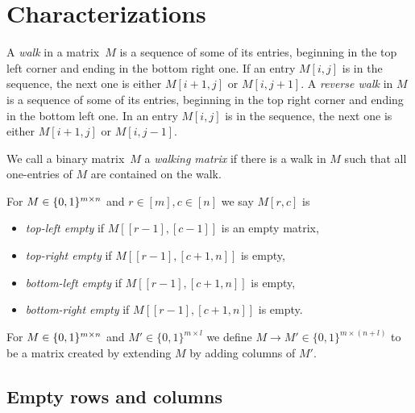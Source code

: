 \newsavebox{\smlmat}
\savebox{\smlmat}{$\smm{\bullet&\bullet\\\bullet& }$}
\newsavebox{\smlmatb}
\savebox{\smlmatb}{$\smm{\bullet&\bullet\\\bullet&\bullet}$}
\newsavebox{\smlmatc}
\savebox{\smlmatc}{$\smm{\bullet&\bullet&\bullet\\ &\bullet& }$}

\chapter{Characterizations}

\begin{defn}
A \emph{walk} in a matrix~$M$ is a sequence of some of its entries, beginning in the top left corner and ending in the bottom right one. If an entry $M[i,j]$ is in the sequence, the next one is either $M[i+1,j]$ or $M[i,j+1]$. A \emph{reverse walk} in $M$ is a sequence of some of its entries, beginning in the top right corner and ending in the bottom left one. In an entry $M[i,j]$ is in the sequence, the next one is either $M[i+1,j]$ or $M[i,j-1]$.
\end{defn}

\begin{defn}
We call a binary matrix~$M$ a \emph{walking matrix} if there is a walk in $M$ such that all one-entries of $M$ are contained on the walk.
\end{defn}

\begin{defn}
For $M\in\{0,1\}^{m\times n}$ and $r\in[m],c\in[n]$ we say $M[r,c]$ is
\begin{itemize}
	\item \emph{top-left empty} if $M[[r-1],[c-1]]$ is an empty matrix,
	\item \emph{top-right empty} if $M[[r-1],[c+1,n]]$ is empty,
	\item \emph{bottom-left empty} if $M[[r-1],[c+1,n]]$ is empty,
	\item \emph{bottom-right empty} if $M[[r-1],[c+1,n]]$ is empty.
\end{itemize}
\end{defn}

\begin{defn}
For $M\in\{0,1\}^{m\times n}$ and $M'\in\{0,1\}^{m\times l}$ we define $M\rightarrow M'\in\{0,1\}^{m\times(n+l)}$ to be a matrix created by extending $M$ by adding columns of $M'$.
\end{defn}

\section{Empty rows and columns}
\label{sec:empty}

